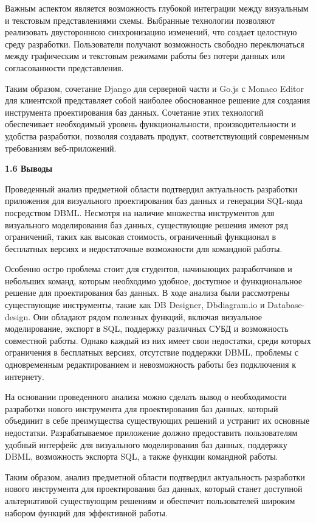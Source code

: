 Важным аспектом является возможность глубокой интеграции между визуальным и текстовым представлениями схемы. Выбранные технологии позволяют реализовать двустороннюю синхронизацию изменений, что создает целостную среду разработки. Пользователи получают возможность свободно переключаться между графическим и текстовым режимами работы без потери данных или согласованности представления.

Таким образом, сочетание Django для серверной части и Go.js с Monaco Editor для клиентской представляет собой наиболее обоснованное решение для создания инструмента проектирования баз данных. Сочетание этих технологий обеспечивает необходимый уровень функциональности, производительности и удобства разработки, позволяя создавать продукт, соответствующий современным требованиям веб-приложений.

\newpage

\textbf{1.6 Выводы}

Проведенный анализ предметной области подтвердил актуальность разработки приложения для визуального проектирования баз данных и генерации SQL-кода посредством DBML. Несмотря на наличие множества инструментов для визуального моделирования баз данных, существующие решения имеют ряд ограничений, таких как высокая стоимость, ограниченный функционал в бесплатных версиях и недостаточные возможности для командной работы.

Особенно остро проблема стоит для студентов, начинающих разработчиков и небольших команд, которым необходимо удобное, доступное и функциональное решение для проектирования баз данных. В ходе анализа были рассмотрены существующие инструменты, такие как DB Designer, Dbdiagram.io и Database-design. Они обладают рядом полезных функций, включая визуальное моделирование, экспорт в SQL, поддержку различных СУБД и возможность совместной работы. Однако каждый из них имеет свои недостатки, среди которых ограничения в бесплатных версиях, отсутствие поддержки DBML, проблемы с одновременным редактированием и невозможность работы без подключения к интернету.

На основании проведенного анализа можно сделать вывод о необходимости разработки нового инструмента для проектирования баз данных, который объединит в себе преимущества существующих решений и устранит их основные недостатки. Разрабатываемое приложение должно предоставить пользователям удобный интерфейс для визуального моделирования баз данных, поддержку DBML, возможность экспорта SQL, а также функции командной работы.

Таким образом, анализ предметной области подтвердил актуальность разработки нового инструмента для проектирования баз данных, который станет доступной альтернативой существующим решениям и обеспечит пользователей широким набором функций для эффективной работы.